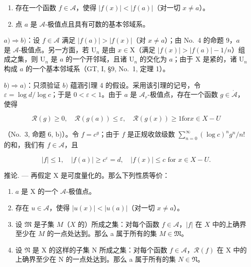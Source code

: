 \begin{enumerate}
\def\labelenumi{\alph{enumi})}
\item
  存在一个函数 \(f \in \mathcal{A}\)，使得 \(|f(x)| < |f(a)|\)（对一切 \(x \neq a\)）。
\item
  点 \(a\) 是 \(\mathcal{A}\)-极值点且具有可数的基本邻域系。
\end{enumerate}

\(a) \Rightarrow b)\)：设 \(f \in \mathcal{A}\) 满足 \(|f(a)| > |f(x)|\)（对 \(x \neq a\)）；由 No.~4 的命题 9，\(a\) 是 \(\mathcal{A}\)-极值点。另一方面，若 \(\mathrm{U}_n\) 是由 \(x \in \mathrm{X}\)（满足 \(|f(x)| > |f(a)| - 1/n\)）组成之集，则 \(\mathrm{U}_n\) 是 \(a\) 的一个开邻域，且诸 \(\mathrm{U}_n\) 的交化为 \(a\)；由于 \(\mathrm{X}\) 是紧的，诸 \(\mathrm{U}_n\) 构成 \(a\) 的一个基本邻域系（GT, I, §9, No.~1, 定理 1）。

\(b) \Rightarrow a)\)：只须验证 \(b)\) 蕴涵引理 4 的假设。采用该引理的记号，令 \(\varepsilon = \log d / \log c\)；于是 \(0 < \varepsilon < 1\)。由于 \(a\) 是 \(\mathcal{A}_r\)-极值点，存在一个函数 \(g \in \dot{\mathcal{A}}\)，使得

\[
\mathcal {R} (g) \geqslant 0, \quad \mathcal {R} (g (a)) \leqslant \varepsilon , \quad \mathcal {R} (g (x)) \geqslant 1 \text {for} x \in X - U
\]

（No.~3, 命题 6, b)）。令 \(f = c^g\)；由于 \(f\) 是正规收敛级数 \(\sum_{n=0}^{\infty} (\log c)^n g^n / n!\) 的和，我们有 \(f \in \mathcal{A}\)，且

\[
| f | \leqslant 1, \quad | f (a) | \geqslant c ^ {\varepsilon} = d, \quad | f (x) | \leqslant c \text { for } x \in X - U.\tag{Q.E.D.}
\]

推论. --- 再假定 X 是可度量化的。那么下列性质等价：

\begin{enumerate}
\def\labelenumi{\alph{enumi})}
\item
  \(a\) 是 X 的一个 \(\mathcal{A}\)-极值点。
\item
  存在 \(u \in \mathcal{A}\)，使得 \(|u(x)| < |u(a)|\)（对一切 \(x \neq a\)）。
\item
  设 \(\mathfrak{M}\) 是子集 \(M\)（\(X\) 的）所成之集：对每个函数 \(f \in \mathcal{A}\)，\(|f|\) 在 \(X\) 中的上确界至少在 \(M\) 的一点处达到。那么 a 属于所有的集 \(M \in \mathfrak{M}\)。
\item
  设 \(\mathfrak{N}\) 是 X 的这样的子集 N 所成之集：对每个函数 \(f \in \mathcal{A}\)，\(\mathcal{R}(f)\) 在 X 中的上确界至少在 N 的一点处达到。那么 a 属于所有的集 \(N \in \mathfrak{N}\)。
\end{enumerate}

